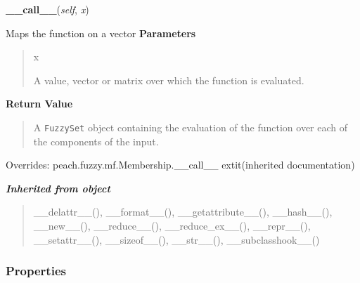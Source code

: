     \vspace{0.5ex}

\hspace{.8\funcindent}\begin{boxedminipage}{\funcwidth}

    \raggedright \textbf{\_\_call\_\_}(\textit{self}, \textit{x})

\setlength{\parskip}{2ex}

Maps the function on a vector
\setlength{\parskip}{1ex}
      \textbf{Parameters}
      \vspace{-1ex}

      \begin{quote}
        \begin{Ventry}{x}

          \item[x]


A value, vector or matrix over which the function is evaluated.
        \end{Ventry}

      \end{quote}

      \textbf{Return Value}
    \vspace{-1ex}

      \begin{quote}

A \texttt{FuzzySet} object containing the evaluation of the function over
each of the components of the input.
      \end{quote}

      Overrides: peach.fuzzy.mf.Membership.\_\_call\_\_ 	extit{(inherited documentation)}

    \end{boxedminipage}


\large{\textbf{\textit{Inherited from object}}}

\begin{quote}
\_\_delattr\_\_(), \_\_format\_\_(), \_\_getattribute\_\_(), \_\_hash\_\_(), \_\_new\_\_(), \_\_reduce\_\_(), \_\_reduce\_ex\_\_(), \_\_repr\_\_(), \_\_setattr\_\_(), \_\_sizeof\_\_(), \_\_str\_\_(), \_\_subclasshook\_\_()
\end{quote}


  \subsubsection{Properties}

